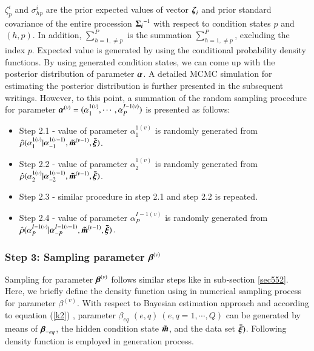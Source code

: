 \documentclass[a4paper,oneside,onecolumn,preprint,10pt,authoryear]{elsarticle}
\begin{document}
$\zeta_{p}^i$ and $\sigma_{hp}^{i}$ are the prior expected values of vector $\mbox{\boldmath$\zeta$}_i$ and prior standard covariance of the entire procession $\mbox{\boldmath$\Sigma_i$}^{-1}$ with respect to condition states $p$ and $(h,p)$. In addition, $\sum_{h=1,\neq p}^{P}$ is the summation $\sum_{h=1,\neq p}^{P}$, excluding the index $p$. Expected value is generated by using the conditional probability density functions. By using generated condition states, we can come up with the posterior distribution of parameter $\mbox{\boldmath$\alpha$}$. A detailed MCMC simulation for estimating the posterior distribution is further presented in the subsequent writings. However, to this point, a summation of the random sampling procedure for parameter $\mbox{\boldmath$\alpha$}^{(v)}=(\alpha_{1}^{1(v)},\cdots,\alpha_{P}^{I-1(v)})$ is presented as follows:
\begin{itemize}
\item {Step 2.1 - value of parameter $\alpha_{1}^{1(v)}$ is randomly generated from 
$\hat{\rho}(\alpha_{1}^{1(v)}|\mbox{\boldmath$\alpha$}_{-1}^{1(v-1)},\mbox{\boldmath$\tilde{m}$}^{(v-1)},\mbox{\boldmath$\bar{\xi}$})$}.
\item{Step 2.2 - value of parameter $\alpha_{2}^{1(v)}$ is randomly generated from $\hat{\rho}(\alpha_{2}^{1(v)}|\mbox{\boldmath$\alpha$}_{-2}^{1(v-1)},\mbox{\boldmath$\tilde{m}$}^{(v-1)},\mbox{\boldmath$\bar{\xi}$})$}.
\item{Step 2.3 - similar procedure in step 2.1 and step 2.2 is repeated.}
\item{Step 2.4 - value of parameter $\alpha_{P}^{I-1(v)}$ is randomly generated from $\hat{\rho}(\alpha_{P}^{I-1(v)}|\mbox{\boldmath$\alpha$}_{-P}^{I-1(v-1)},\mbox{\boldmath$\tilde{m}$}^{(v-1)},\mbox{\boldmath$\bar{\xi}$})$}.
\end{itemize}

\subsubsection{Step 3: Sampling parameter $\mbox{\boldmath$\beta$}^{(v)}$} \label{sec553}
Sampling for parameter $\mbox{\boldmath$\beta$}^{(v)}$ follows similar steps like in sub-section \ref{sec552}. Here, we briefly define the density function using in numerical sampling process for parameter $\beta^{(v)}$. With respect to Bayesian estimation approach and according to equation (\ref{k2}) , parameter $\beta_{eq}$ $(e,q)~(e,q=1,\cdots,Q)$ can be generated by means of $\mbox{\boldmath$\beta$}_{-eq}$, the hidden condition state $\mbox{\boldmath$\tilde{m}$}$, and the data set $\mbox{\boldmath$\bar{\xi}$})$. Following density function is employed in generation process.
\end{document}
